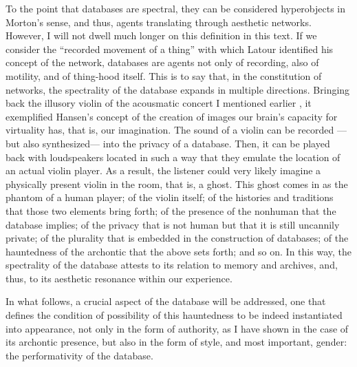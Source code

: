 To the point that databases are spectral, they can be considered hyperobjects in Morton's sense, and thus, agents translating through aesthetic networks. However, I will not dwell much longer on this definition in this text. If we consider the ``recorded movement of a thing'' with which Latour identified his concept of the network, databases are agents not only of recording, also of motility, and of thing-hood itself. This is to say that, in the constitution of networks, the spectrality of the database expands in multiple directions. Bringing back the illusory violin of the acousmatic concert I mentioned earlier , it exemplified Hansen's concept of the creation of images our brain's capacity for virtuality has, that is, our imagination. The sound of a violin can be recorded ---but also synthesized--- into the privacy of a database. Then, it can be played back with loudspeakers located in such a way that they emulate the location of an actual violin player. As a result, the listener could very likely imagine a physically present violin in the room, that is, a ghost. This ghost comes in as the phantom of a human player; of the violin itself; of the histories and traditions that those two elements bring forth; of the presence of the nonhuman that the database implies; of the privacy that is not human but that it is still uncannily private; of the plurality that is embedded in the construction of databases; of the hauntedness of the archontic that the above sets forth; and so on. In this way, the spectrality of the database attests to its relation to memory and archives, and, thus, to its aesthetic resonance within our experience.

In what follows, a crucial aspect of the database will be addressed, one that defines the condition of possibility of this hauntedness to be indeed instantiated into appearance, not only in the form of authority, as I have shown in the case of its archontic presence, but also in the form of style, and most important, gender: the performativity of the database.
